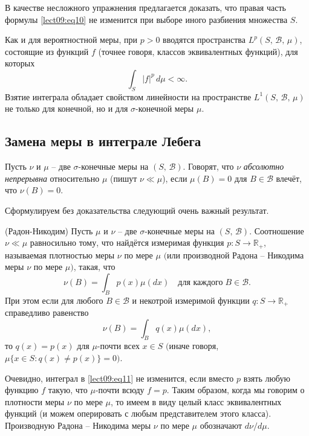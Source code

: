 В качестве несложного упражнения предлагается доказать, что правая часть формулы \ref{lect09:eq10} не изменится при выборе иного разбиения множества $S$.

Как и для вероятностной меры, при $p>0$ вводятся пространства $L^p(S,\,\mathcal{B},\,\mu)$, состоящие из функций $f$ (точнее говоря, классов эквивалентных функций), для которых 
\[ \int_S|f|^p\,d\mu<\infty. \]
Взятие интеграла обладает свойством линейности на пространстве $L^1(S,\,\mathcal{B},\,\mu)$ не только для конечной, но и для $\sigma$-конечной меры $\mu$.

\subsection{Замена меры в интеграле Лебега}

\begin{definition}\label{lect09:def4}
Пусть $\nu$ и $\mu$ -- две $\sigma$-конечные меры на $(S,\,\mathcal{B})$. Говорят, что $\nu$ \emph{абсолютно непрерывна} относительно $\mu$ (пишут $\nu\ll\mu$), если $\mu(B)=0$ для $B\in\mathcal{B}$ влечёт, что $\nu(B)=0$.
\end{definition}

Сформулируем без доказательства следующий очень важный результат.

\begin{theorem}\label{lect09:th1}
    (Радон-Никодим)
Пусть $\mu$ и $\nu$ -- две $\sigma$-конечные меры на $(S,\,\mathcal{B})$. Соотношение $\nu\ll\mu$ равносильно тому, что найдётся измеримая функция $p\colon S\to\mathbb{R}_+$, называемая плотностью меры $\nu$ по мере $\mu$ $($или производной Радона -- Никодима меры $\nu$ по мере $\mu)$, такая, что 
\begin{equation}\label{lect09:eq11}
\nu(B)=\int_Bp(x)\mu(dx)\quad\text{для каждого}\;B\in\mathcal{B}.
\end{equation}
При этом если для любого $B\in\mathcal{B}$ и некотрой измеримой функции $q\colon S\to\mathbb{R}_+$ справедливо равенство
\[ \nu(B)=\int_Bq(x)\mu(dx), \]
то $q(x)=p(x)$ для $\mu$-почти всех $x\in S$ $($иначе говоря, $\mu\{x\in S:q(x)\neq p(x)\}=0)$.
\end{theorem}

Очевидно, интеграл в \ref{lect09:eq11} не изменится, если вместо $p$ взять любую функцию $f$ такую, что $\mu$-почти всюду $f=p$. Таким образом, когда мы говорим о плотности меры $\nu$ по мере $\mu$, то имеем в виду целый класс эквивалентных функций (и можем оперировать с любым представителем этого класса). Производную Радона -- Никодима меры $\nu$ по мере $\mu$ обозначают $d\nu/d\mu$.

